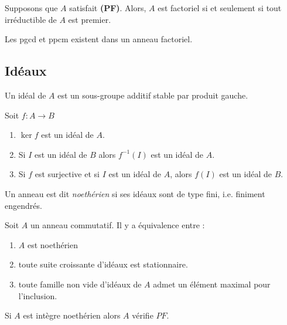 \documentclass{cours}
\begin{document}
\begin{proposition}
    Supposons que $A$ satisfait \textbf{(PF)}. Alors, $A$ est factoriel si et seulement si tout irréductible de $A$ est premier.
\end{proposition}

\begin{lemma}
    Les pgcd et ppcm existent dans un anneau factoriel.
\end{lemma}

\subsection{Idéaux}
\begin{definition}
    Un idéal de $A$ est un sous-groupe additif stable par produit gauche. 
\end{definition}

\begin{lemma}
    Soit $f : A\rightarrow B$ 
    \begin{enumerate}
        \item $\ker f$ est un idéal de $A$. 
        \item Si $I$ est un idéal de $B$ alors $f^{-1}(I)$ est un idéal de $A$. 
        \item Si $f$ est surjective et si $I$ est un idéal de $A$, alors $f(I)$ est un idéal de $B$. 
    \end{enumerate}
\end{lemma}

\begin{definition}
    Un anneau est dit \emph{noethérien} si ses idéaux sont de type fini, i.e. finiment engendrés.  
\end{definition}

\begin{proposition}
    Soit $A$ un anneau commutatif. Il y a équivalence entre : 
    \begin{enumerate}
        \item $A$ est noethérien
        \item toute suite croissante d'idéaux est stationnaire. 
        \item toute famille non vide d'idéaux de $A$ admet un élément maximal pour l'inclusion. 
    \end{enumerate}
\end{proposition}

\begin{proposition}
    Si $A$ est intègre noethérien alors $A$ vérifie $PF$. 
\end{proposition}
\end{document}
